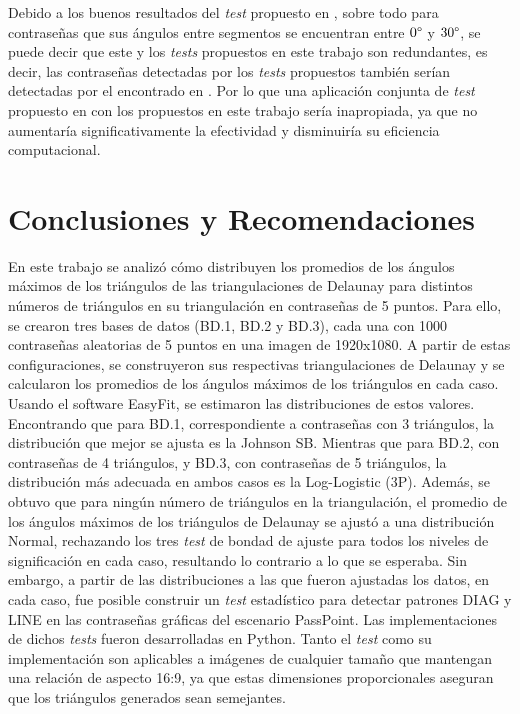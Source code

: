 \documentclass[12pt]{report}
\begin{document}
Debido a los buenos resultados del \textit{test} propuesto en \cite{13}, sobre todo para contraseñas que sus ángulos entre segmentos se encuentran entre $0\degree$ y $30\degree$, se puede decir que este y los \textit{tests} propuestos en este trabajo son redundantes, es decir, las contraseñas detectadas por los\textit{ tests} propuestos también serían detectadas por el encontrado en \cite{13}. Por lo que una aplicación conjunta de \textit{test} propuesto en \cite{13} con los propuestos en este trabajo sería inapropiada, ya que no aumentaría significativamente la efectividad y disminuiría su eficiencia computacional.

\chapter*{Conclusiones y Recomendaciones }
En este trabajo se analizó cómo distribuyen los promedios de los ángulos máximos de los triángulos de las triangulaciones de Delaunay para distintos números de triángulos en su triangulación en contraseñas de 5 puntos. Para ello, se crearon tres bases de datos (BD.1, BD.2 y BD.3), cada una con 1000 contraseñas aleatorias de 5 puntos en una imagen de 1920x1080. A partir de estas configuraciones, se construyeron sus respectivas triangulaciones de Delaunay y se calcularon los promedios de los ángulos máximos de los triángulos en cada caso. Usando el software EasyFit, se estimaron las distribuciones de estos valores. Encontrando que para BD.1, correspondiente a contraseñas con 3 triángulos, la distribución que mejor se ajusta es la Johnson SB. Mientras que para BD.2, con contraseñas de 4 triángulos, y BD.3, con contraseñas de 5 triángulos, la distribución más adecuada en ambos casos es la Log-Logistic (3P). Además, se obtuvo que para ningún número de  triángulos en la triangulación, el promedio de los ángulos máximos de los triángulos de Delaunay  se ajustó a una distribución Normal, rechazando los tres \textit{test} de bondad de ajuste para todos los niveles de significación en cada caso, resultando lo contrario a lo que se esperaba. Sin embargo, a partir de las distribuciones a las que fueron ajustadas los datos, en cada caso, fue posible construir un \textit{test} estadístico para detectar patrones DIAG y LINE en las contraseñas gráficas del escenario PassPoint. Las implementaciones de dichos \textit{tests} fueron desarrolladas en Python. Tanto el \textit{test} como su implementación son aplicables a imágenes de cualquier tamaño que mantengan una relación de aspecto 16:9, ya que estas dimensiones proporcionales aseguran que los triángulos generados sean semejantes. 
\end{document}
